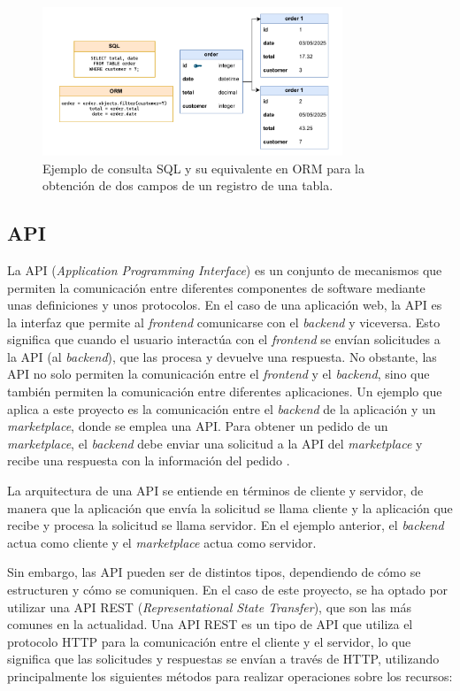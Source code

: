 \begin{figure}[H]
    \centering
    \includegraphics[width=0.8\textwidth]{figures/theoric_frame/orm_vs_sql.pdf}
    \caption{Ejemplo de consulta SQL y su equivalente en ORM para la obtención de dos campos de un registro de una tabla.}
    \label{fig:orm_vs_sql}
\end{figure}

\subsection{API}
\label{sec:api}

La API (\textit{Application Programming Interface}) es un conjunto de mecanismos que permiten la comunicación entre diferentes componentes de software mediante unas definiciones y unos protocolos. En el caso de una aplicación web, la API es la interfaz que permite al \textit{frontend} comunicarse con el \textit{backend} y viceversa. Esto significa que cuando el usuario interactúa con el \textit{frontend} se envían solicitudes a la API (al \textit{backend}), que las procesa y devuelve una respuesta. No obstante, las API no solo permiten la comunicación entre el \textit{frontend} y el \textit{backend}, sino que también permiten la comunicación entre diferentes aplicaciones. Un ejemplo que aplica a este proyecto es la comunicación entre el \textit{backend} de la aplicación y un \textit{marketplace}, donde se emplea una API. Para obtener un pedido de un \textit{marketplace}, el \textit{backend} debe enviar una solicitud a la API del \textit{marketplace} y recibe una respuesta con la información del pedido \cite{aws_api}.

La arquitectura de una API se entiende en términos de cliente y servidor, de manera que la aplicación que envía la solicitud se llama cliente y la aplicación que recibe y procesa la solicitud se llama servidor. En el ejemplo anterior, el \textit{backend} actua como cliente y el \textit{marketplace} actua como servidor.

Sin embargo, las API pueden ser de distintos tipos, dependiendo de cómo se estructuren y cómo se comuniquen. En el caso de este proyecto, se ha optado por utilizar una API REST (\textit{Representational State Transfer}), que son las más comunes en la actualidad. Una API REST es un tipo de API que utiliza el protocolo HTTP para la comunicación entre el cliente y el servidor, lo que significa que las solicitudes y respuestas se envían a través de HTTP, utilizando principalmente los siguientes métodos para realizar operaciones sobre los recursos:

